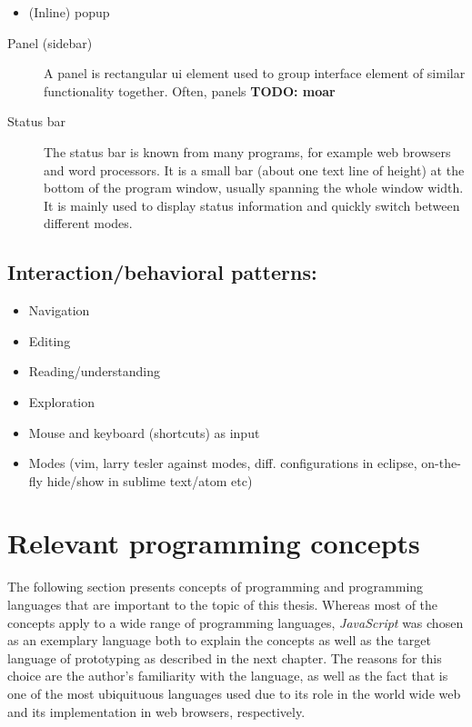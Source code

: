 \begin{itemize}
\itemsep1pt\parskip0pt
\item
  (Inline) popup
\end{itemize}

\begin{description}
\item[Panel (sidebar)]
A panel is rectangular \ac{ui} element used to group interface element
of similar functionality together. Often, panels \textbf{TODO: moar}
\item[Status bar]
The status bar is known from many programs, for example web browsers and
word processors. It is a small bar (about one text line of height) at
the bottom of the program window, usually spanning the whole window
width. It is mainly used to display status information and quickly
switch between different modes.
\end{description}

\subsection{Interaction/behavioral
patterns:}\label{interactionbehavioral-patterns}

\begin{itemize}
\itemsep1pt\parskip0pt
\item
  Navigation
\item
  Editing
\item
  Reading/understanding
\item
  Exploration
\item
  Mouse and keyboard (shortcuts) as input
\item
  Modes (vim, larry tesler against modes, diff. configurations in
  eclipse, on-the-fly hide/show in sublime text/atom etc)
\end{itemize}

\section{Relevant programming
concepts}\label{relevant-programming-concepts}

The following section presents concepts of programming and programming
languages that are important to the topic of this thesis. Whereas most
of the concepts apply to a wide range of programming languages,
\emph{JavaScript} was chosen as an exemplary language both to explain
the concepts as well as the target language of prototyping as described
in the next chapter. The reasons for this choice are the author’s
familiarity with the language, as well as the fact that is one of the
most ubiquituous languages used due to its role in the world wide web
and its implementation in web browsers, respectively.


